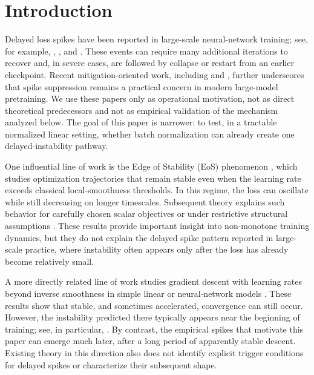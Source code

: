\documentclass[pdflatex,sn-basic]{sn-jnl}%
\theoremstyle{thmstyleone}%
\begin{document}
\section{Introduction}

Delayed loss spikes have been reported in large-scale neural-network training; see, for example, \citet{spike_GLM}, \citet{spike_PaLM}, and \citet{Spike_A_theory_on}. These events can require many additional iterations to recover and, in severe cases, are followed by collapse or restart from an earlier checkpoint. Recent mitigation-oriented work, including \citet{kumar2025zclip} and \citet{wang2025adagc}, further underscores that spike suppression remains a practical concern in modern large-model pretraining. We use these papers only as operational motivation, not as direct theoretical predecessors and not as empirical validation of the mechanism analyzed below. The goal of this paper is narrower: to test, in a tractable normalized linear setting, whether batch normalization can already create one delayed-instability pathway.

One influential line of work is the Edge of Stability (EoS) phenomenon \citep{First_EOS}, which studies optimization trajectories that remain stable even when the learning rate exceeds classical local-smoothness thresholds. In this regime, the loss can oscillate while still decreasing on longer timescales. Subsequent theory explains such behavior for carefully chosen scalar objectives \citep{eos_minimalist,eos_monotonically_decreases_the_sharpness} or under restrictive structural assumptions \citep{ahn2022understanding,ma2022beyond}. These results provide important insight into non-monotone training dynamics, but they do not explain the delayed spike pattern reported in large-scale practice, where instability often appears only after the loss has already become relatively small.

A more directly related line of work studies gradient descent with learning rates beyond inverse smoothness in simple linear or neural-network models \citep{eos_logistic_regression,andriushchenko2023sgd,wu2024large,lu2023benign}. These results show that stable, and sometimes accelerated, convergence can still occur. However, the instability predicted there typically appears near the beginning of training; see, in particular, \citet{eos_logistic_regression}. By contrast, the empirical spikes that motivate this paper can emerge much later, after a long period of apparently stable descent. Existing theory in this direction also does not identify explicit trigger conditions for delayed spikes or characterize their subsequent shape.
\end{document}
